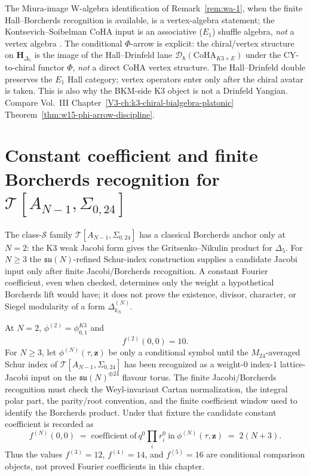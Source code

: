 \begin{remark}
\label{rem:wa-4-supplement}
The Miura-image W-algebra identification of
Remark~\ref{rem:wa-1}, when the finite Hall--Borcherds recognition is
available, is a vertex-algebra statement; the
Kontsevich--Soibelman CoHA input is an associative ($E_1$) shuffle
algebra, \emph{not} a vertex algebra \cite{kontsevich-soibelman}.
The conditional $\Phi$-arrow is explicit: the chiral/vertex
structure on $\mathbf H_{\Delta_5}$ is the image of the
Hall--Drinfeld lane
$\mathcal D_\hbar(\mathrm{CoHA}_{K3\times E})$ under the
CY-to-chiral functor $\Phi$, \emph{not} a direct CoHA vertex
structure. The Hall--Drinfeld double preserves the $E_1$ Hall
category; vertex operators enter only after the chiral avatar is
taken. This is also why the BKM-side K3 object is not a Drinfeld
Yangian.
Compare Vol.~III
Chapter~\ref{V3-ch:k3-chiral-bialgebra-platonic}
Theorem~\ref{thm:w15-phi-arrow-discipline}.
\end{remark}


\section{Constant coefficient and finite Borcherds recognition for
$\mathcal T[A_{N-1}, \Sigma_{0,24}]$}
\label{sec:wa-supplement-iii}

The class-$\mathcal S$ family
$\mathcal T[A_{N-1}, \Sigma_{0,24}]$ has a classical Borcherds anchor
only at $N=2$: the K3 weak Jacobi form gives the Gritsenko--Nikulin
product for $\Delta_5$. For $N \ge 3$ the $\mathfrak{su}(N)$-refined
Schur-index construction supplies a candidate Jacobi input only after
finite Jacobi/Borcherds recognition. A constant Fourier coefficient,
even when checked, determines only the weight a hypothetical Borcherds
lift would have; it does not prove the existence, divisor, character, or
Siegel modularity of a form $\Delta_{k_N}^{(N)}$.

\begin{proposition}[constant coefficient at $N=2$ and conditional
 $N$-fixture; \ClaimStatusConditional]
\label{prop:wa-f-constant}
At $N=2$, $\phi^{(2)}=\phi_{0,1}^{K3}$ and
\[
 f^{(2)}(0,0)=10.
\]
For $N\ge 3$, let $\phi^{(N)}(\tau,\mathbf z)$ be only a conditional
symbol until the $M_{24}$-averaged Schur index of
$\mathcal T[A_{N-1},\Sigma_{0,24}]$ has been recognized as a
weight-$0$ index-$1$ lattice-Jacobi input on the
$\mathfrak{su}(N)^{\oplus 24}$ flavour torus. The finite
Jacobi/Borcherds recognition must check the Weyl-invariant Cartan
normalization, the integral polar part, the parity/root convention, and
the finite coefficient window used to identify the Borcherds product.
Under that fixture the candidate constant coefficient is recorded as
\[
 f^{(N)}(0, 0)
 \;=\;
 \mathrm{coefficient\ of\ } q^0 \prod_i r_i^0 \mathrm{\ in\ }
 \phi^{(N)}(\tau, \mathbf z)
 \;=\; 2(N + 3).
\]
Thus the values $f^{(3)}=12$, $f^{(4)}=14$, and $f^{(5)}=16$ are
conditional comparison objects, not proved Fourier coefficients in
this chapter.
\end{proposition}

